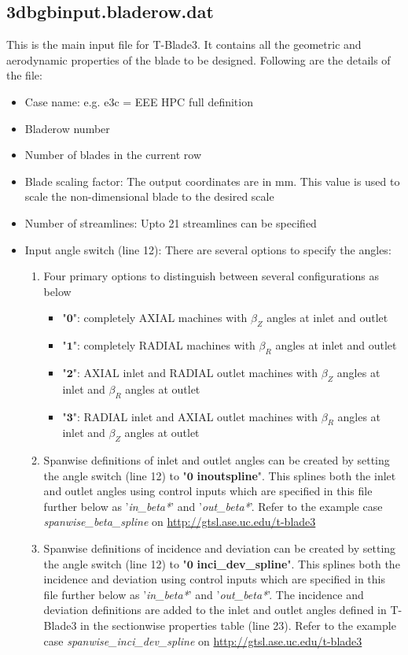 \documentclass[8pt]{article}
\begin{document}
\subsection{3dbgbinput.bladerow.dat}\label{maininput}
\noindent
This is the main input file for T-Blade3. It contains all the geometric and aerodynamic properties of the blade to be designed. Following are the details of the file:
\begin{itemize}[leftmargin=*]
    \item Case name: e.g. e3c = EEE HPC full definition
    \item Bladerow number
    \item Number of blades in the current row
    \item Blade scaling factor: The output coordinates are in mm. This value is used to scale the non-dimensional blade to the desired scale
    \item Number of streamlines: Upto 21 streamlines can be specified
    \item Input angle switch (line 12): There are several options to specify the angles:
    \begin{enumerate}[label=\alph*]
        \item Four primary options to distinguish between several configurations as below
        \begin{itemize}[label=\FilledSmallSquare]
            \item "$\mathbf{0}$": completely AXIAL machines with $\beta_{Z}$ angles at inlet and outlet
            \item "$\mathbf{1}$": completely RADIAL machines with $\beta_{R}$ angles at inlet and outlet
            \item "$\mathbf{2}$": AXIAL inlet and RADIAL outlet machines with $\beta_{Z}$ angles at inlet and $\beta_{R}$ angles at outlet
            \item "$\mathbf{3}$": RADIAL inlet and AXIAL outlet machines with $\beta_{R}$ angles at inlet and $\beta_{Z}$ angles at outlet
        \end{itemize}
        \item Spanwise definitions of inlet and outlet angles can be created by setting the angle switch (line 12) to "$\mathbf{0}$ \textbf{inoutspline}". This splines both the inlet and outlet angles using control inputs which are specified in this file further below as '\textit{in\_beta*}' and '\textit{out\_beta*}'. Refer to the example case \textit{spanwise\_beta\_spline} on \url{http://gtsl.ase.uc.edu/t-blade3}
        \item Spanwise definitions of incidence and deviation can be created by setting the angle switch (line 12) to "$\mathbf{0}$ \textbf{inci\_dev\_spline}". This splines both the incidence and deviation using control inputs which are specified in this file further below as '\textit{in\_beta*}' and '\textit{out\_beta*}'. The incidence and deviation definitions are added to the inlet and outlet angles defined in T-Blade3 in the sectionwise properties table (line 23). Refer to the example case \textit{spanwise\_inci\_dev\_spline} on \url{http://gtsl.ase.uc.edu/t-blade3}

\end{enumerate}
\end{itemize}
\end{document}
